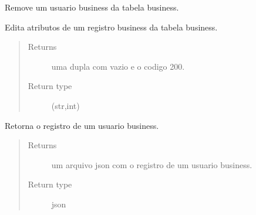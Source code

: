 \documentclass[letterpaper,10pt,english]{sphinxmanual}
\begin{document}

\begin{fulllineitems}
\label{\detokenize{index:business.del_Business}}
Remove um usuario business da tabela
business.

\end{fulllineitems}


\begin{fulllineitems}
\label{\detokenize{index:business.edit_Business}}
Edita atributos de um registro business
da tabela business.
\begin{quote}\begin{description}
\item[{Returns}] \leavevmode
uma dupla com vazio e o codigo 200.

\item[{Return type}] \leavevmode
(str,int)

\end{description}\end{quote}

\end{fulllineitems}


\begin{fulllineitems}
\label{\detokenize{index:business.get_bussiness}}
Retorna o registro de um usuario
business.
\begin{quote}\begin{description}
\item[{Returns}] \leavevmode
um arquivo json com o registro de um usuario business.

\item[{Return type}] \leavevmode
json

\end{description}\end{quote}

\end{fulllineitems}
\end{document}
